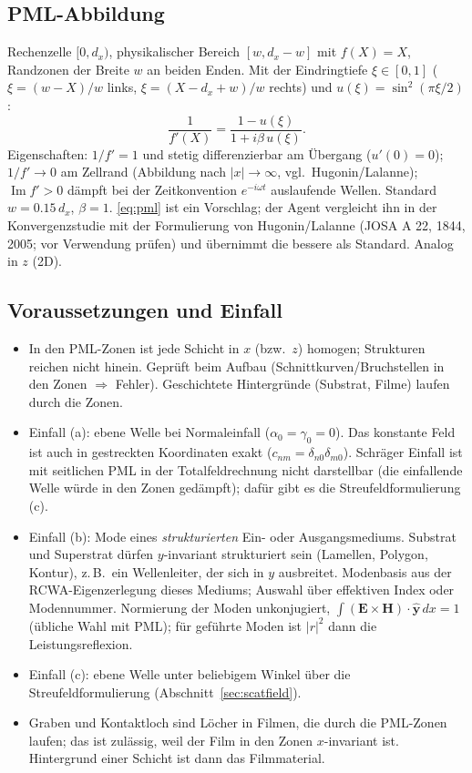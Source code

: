 \subsection{PML-Abbildung}
Rechenzelle $[0,d_x)$, physikalischer Bereich $[w,d_x-w]$ mit $f(X)=X$, Randzonen der Breite $w$ an beiden Enden.
Mit der Eindringtiefe $\xi\in[0,1]$ ($\xi=(w-X)/w$ links, $\xi=(X-d_x+w)/w$ rechts) und $u(\xi)=\sin^2(\pi\xi/2)$:
\begin{equation}
  \frac{1}{f'(X)}=\frac{1-u(\xi)}{1+i\beta\,u(\xi)} .
  \label{eq:pml}
\end{equation}
Eigenschaften: $1/f'=1$ und stetig differenzierbar am Übergang ($u'(0)=0$); $1/f'\to0$ am Zellrand (Abbildung
nach $|x|\to\infty$, vgl.\ Hugonin/Lalanne); $\operatorname{Im}f'>0$ dämpft bei der Zeitkonvention $e^{-i\omega t}$
auslaufende Wellen. Standard $w=0.15\,d_x$, $\beta=1$. \eqref{eq:pml} ist ein Vorschlag; der Agent vergleicht ihn in der
Konvergenzstudie mit der Formulierung von Hugonin/Lalanne (JOSA A 22, 1844, 2005; vor Verwendung prüfen) und
übernimmt die bessere als Standard. Analog in $z$ (2D).

\subsection{Voraussetzungen und Einfall}
\begin{itemize}[nosep]
  \item In den PML-Zonen ist jede Schicht in $x$ (bzw.\ $z$) homogen; Strukturen reichen nicht hinein. Geprüft beim
        Aufbau (Schnittkurven/Bruchstellen in den Zonen $\Rightarrow$ Fehler). Geschichtete Hintergründe (Substrat,
        Filme) laufen durch die Zonen.
  \item Einfall (a): ebene Welle bei Normaleinfall ($\alpha_0=\gamma_0=0$). Das konstante Feld ist auch in gestreckten
        Koordinaten exakt ($c_{nm}=\delta_{n0}\delta_{m0}$). Schräger Einfall ist mit seitlichen PML in der
        Totalfeldrechnung nicht darstellbar (die einfallende Welle würde in den Zonen gedämpft); dafür gibt es die
        Streufeldformulierung (c).
  \item Einfall (b): Mode eines \emph{strukturierten} Ein- oder Ausgangsmediums. Substrat und Superstrat dürfen
        $y$-invariant strukturiert sein (Lamellen, Polygon, Kontur), z.\,B.\ ein Wellenleiter, der sich in $y$ ausbreitet.
        Modenbasis aus der RCWA-Eigenzerlegung dieses Mediums; Auswahl über effektiven Index oder Modennummer.
        Normierung der Moden unkonjugiert, $\int(\mathbf E\times\mathbf H)\cdot\hat{\mathbf y}\,dx=1$ (übliche Wahl mit PML);
        für geführte Moden ist $|r|^2$ dann die Leistungsreflexion.
  \item Einfall (c): ebene Welle unter beliebigem Winkel über die Streufeldformulierung (Abschnitt~\ref{sec:scatfield}).
  \item Graben und Kontaktloch sind Löcher in Filmen, die durch die PML-Zonen laufen; das ist zulässig, weil der Film in den
        Zonen $x$-invariant ist. Hintergrund einer Schicht ist dann das Filmmaterial.
\end{itemize}

